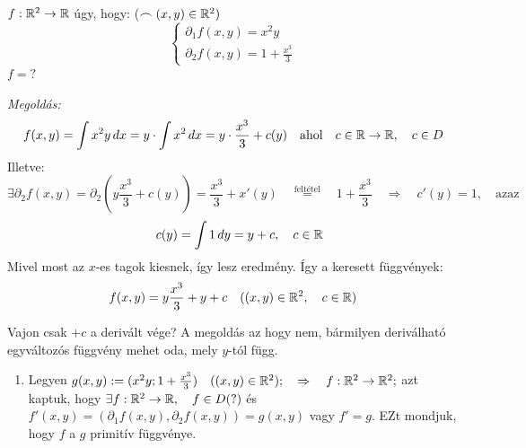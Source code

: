 \documentclass[a4paper,11.5pt]{article}
\begin{document}
	\begin{task}$f:\mathbb{R}^2\to\mathbb{R}$ úgy, hogy: \quad ($\frown(x,y)\in\mathbb{R}^2)$
		\[ \begin{cases}
			\partial_1f(x,y)=x^2y\\
			\partial_2f(x,y)=1+\frac{x^3}{3}
		\end{cases} \]
		$f=?$
		
		\textit{Megoldás:} 
		\[f(x,y)=\int x^2y\,dx =y\cdot\int x^2\,dx=y\cdot\frac{x^3}{3}+c(y)\quad \text{ahol}\quad c\in\mathbb{R}\to\mathbb{R},\quad c\in D \]
		Illetve:
		\[ \exists\partial_2f(x,y)=\partial_2\left(y\frac{x^3}{3}+c(y)\right)=\frac{x^3}{3}+x'(y)\quad \overset{\text{feltétel}}{=}\quad 1+\frac{x^3}{3}\quad \Rightarrow\quad c'(y)=1, \quad \text{azaz}\]
		\[\quad c(y)=\int1\,dy=y+c, \quad c\in\mathbb{R} \]
		Mivel most az $x$-es tagok kiesnek, így lesz eredmény. 
		Így a keresett függvények:
		\[ f(x,y)=y\frac{x^3}{3}+y+c\quad ((x,y)\in\mathbb{R}^2,\quad c\in\mathbb{R}) \]
	\end{task}
	\begin{note}
		Vajon csak $+c$ a derivált vége? A megoldás az hogy nem, bármilyen deriválható egyváltozós függvény mehet oda, mely $y$-tól függ.
	\end{note}
	\begin{note}
		\begin{enumerate}
			\item Legyen $g(x,y):=(x^2y;1+\frac{x^3}{3})\quad ((x,y)\in\mathbb{R}^2);\quad \Rightarrow\quad f:\mathbb{R}^2\to\mathbb{R}^2;$ azt kaptuk, hogy $\exists f:\mathbb{R}^2\to\mathbb{R},\quad f\in D (?)$ és $f'(x,y)=(\partial_1f(x,y),\partial_2f(x,y))=g(x,y)$ vagy $f'=g$. EZt mondjuk, hogy $f$ a $g$ primitív függvénye.
		\end{enumerate}
	\end{note}
\end{document}
